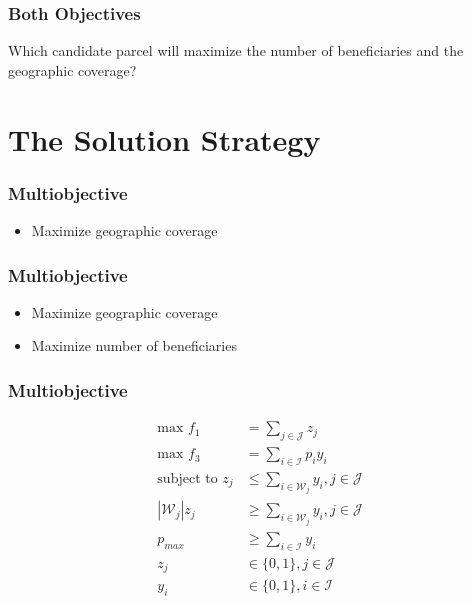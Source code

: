 \documentclass[10pt, compress]{beamer}
\begin{document}
\begin{frame}[fragile]
\frametitle{Both Objectives}
\begin{center}
\end{center}
\begin{block}{Which candidate parcel will maximize the number of beneficiaries and the geographic coverage?}
\end{block}
\end{frame}



\section{The Solution Strategy}

\begin{frame}[fragile]
\frametitle{Multiobjective}
\begin{itemize}
\item Maximize geographic coverage
\end{itemize}
\end{frame}

\begin{frame}[fragile]
\frametitle{Multiobjective}
\begin{itemize}
\item Maximize geographic coverage
\item Maximize number of beneficiaries
\end{itemize}
\end{frame}

\begin{frame}[fragile]
\frametitle{Multiobjective}
\begin{align*}
\textrm{max } f_1 &= \sum_{j \in \mathcal{J}} z_j \\
\textrm{max } f_3 &= \sum_{i \in \mathcal{I}} p_iy_i \\
\textrm{subject to } z_j &\leq \sum_{i \in \mathcal{W}_j} y_i, j \in \mathcal{J}\\
\left|\mathcal{W}_j\right|z_j &\geq \sum_{i \in \mathcal{W}_j} y_i, j \in \mathcal{J} \\
p_{max} &\geq \sum_{i \in \mathcal{I}} y_i  \\
z_j &\in \{0,1\}, j \in \mathcal{J} \\
y_i &\in \{0,1\}, i \in \mathcal{I}
\end{align*}
\end{frame}
\end{document}
